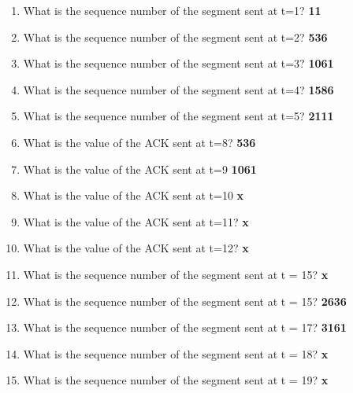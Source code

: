 \begin{enumerate}
    \item What is the sequence number of the segment sent at t=1? \textbf{11}
    \item What is the sequence number of the segment sent at t=2? \textbf{536}
    \item What is the sequence number of the segment sent at t=3? \textbf{1061}
    \item What is the sequence number of the segment sent at t=4? \textbf{1586}
    \item What is the sequence number of the segment sent at t=5? \textbf{2111}
    \item What is the value of the ACK sent at t=8? \textbf{536}
    \item What is the value of the ACK sent at t=9 \textbf{1061}
    \item What is the value of the ACK sent at t=10 \textbf{x}
    \item  What is the value of the ACK sent at t=11? \textbf{x}
    \item What is the value of the ACK sent at t=12? \textbf{x}
    \item What is the sequence number of the segment sent at t = 15? \textbf{x}
    \item What is the sequence number of the segment sent at t = 15? \textbf{2636}
    \item What is the sequence number of the segment sent at t = 17? \textbf{3161}
    \item What is the sequence number of the segment sent at t = 18? \textbf{x}
    \item What is the sequence number of the segment sent at t = 19? \textbf{x}
\end{enumerate}